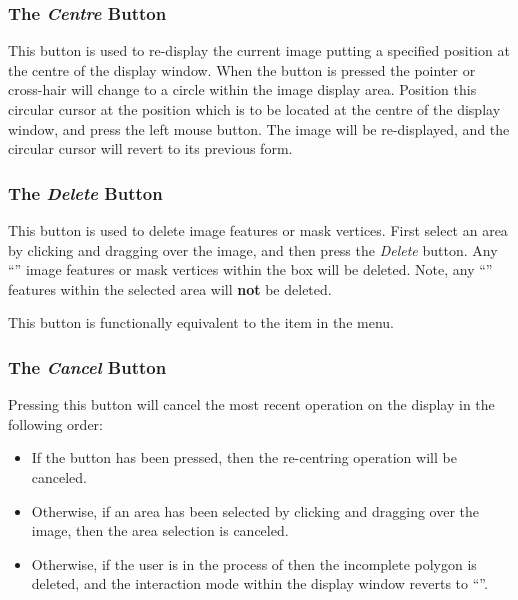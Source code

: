 \subsubsection {The {\em Centre} Button}
This button is used to re-display the current image putting a specified
position at the centre of the display window. When the button is pressed 
the pointer or cross-hair will change to a circle within the image display 
area. Position this circular cursor at the position which is to be
located at the centre of the display window, and press the left mouse
button. The image will be re-displayed, and the circular cursor will
revert to its previous form.

\subsubsection {The {\em Delete} Button}
This button is used to delete image features or mask vertices. First
select an area by clicking and dragging over the image, and then press
the {\em Delete} button. Any ``''
image features or mask vertices within the box will be deleted.
Note, any ``'' features within
the selected area will {\bf not} be deleted.

This button is functionally equivalent to the  item in the  menu.

\subsubsection {The {\em Cancel} Button}
Pressing this button will cancel the most recent operation on the display
in the following order:

\begin{itemize}
\item If the  button has been
pressed, then the re-centring operation will be canceled.

\item Otherwise, if an area has been selected by clicking and dragging
over the image, then the area selection is canceled.

\item Otherwise, if the user is in the process of 
 then the incomplete
polygon is deleted, and the interaction mode within the display window
reverts to ``''.
\end{itemize}

